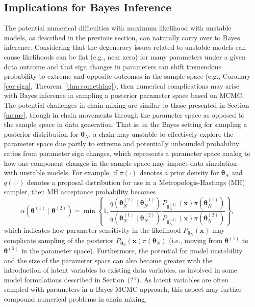 \documentclass[12pt]{article}
\theoremstyle{definition}
\begin{document}
{\subsection{Implications for Bayes Inference}
The potential numerical difficulties with maximum likelihood with unstable models, as described in the previous section, 
can naturally carry over to Bayes inference.  Considering that the degeneracy issues related to unstable models can cause likelihoods can be flat (e.g., near zero) for many parameters under a given data outcome and that
   sign changes in  parameters can shift tremendous probability to extreme and opposite outcomes in the sample space   (e.g., Corollary
\ref{cor:sign}, Theorem~\ref{thm:something}), then numerical complications 
may arise with  Bayes
inference in sampling a posterior parameter space   based on MCMC.   The potential challenges in chain mixing  are similar to those presented in
Section \ref{mcmc}, though in chain movements through the parameter space as opposed to the sample space in data generation.  That is, in the Bayes setting for sampling a posterior distribution for $\boldsymbol \theta_N$,  a chain may  unstable to effectively explore
the parameter space due partly to extreme and potentially unbounded probability ratios from parameter sign changes, which represents a parameter space analog to how one component changes in the sample space may impact data simulation with unstable models.    For example, 
if $\pi(\cdot)$ denotes a prior density for $\boldsymbol \theta_N$ and  \(q(\cdot | \cdot)\)  denotes a proposal distribution 
for use in a Metropologis-Hastings (MH) sampler, then 
 MH acceptance probability becomes \[
\alpha\left(\boldsymbol \theta^{(1)} \mid \boldsymbol \theta^{(2)}\right)= \min\left\{1,
\frac{q(\boldsymbol \theta_N^{(2)} \mid \boldsymbol \theta_N^{(1)})}{q(\boldsymbol \theta_N^{(1)} \mid \boldsymbol \theta_N^{(2)})}
\frac{P_{\boldsymbol \theta_N^{(1)}} ( \boldsymbol x ) \pi(\boldsymbol \theta_N^{(1)}) }{P_{\boldsymbol \theta^{(2)}_N} (  \boldsymbol x) \pi(\boldsymbol \theta_N^{(2)}) } \right\},
\] 
which indicates how parameter sensitivity in the likelihood $P_{\boldsymbol \theta_N} (  \boldsymbol x)$ may complicate sampling of the posterior $P_{\boldsymbol \theta_N} (  \boldsymbol x) \pi(\boldsymbol \theta_N)$    (i.e., moving from $\boldsymbol \theta^{(1)}$ to $\boldsymbol \theta^{(2)}$ in the parameter space).  Furthermore, the potential for model unstability and the size of the parameter space can also become greater with the introduction of latent variables to existing data variables,
as involved in some model formulations described in Section~(??).  As latent variables are often sampled with parameters in a Bayes MCMC approach, this aspect may further compound numerical problems in chain mixing.
 

}
\end{document}
